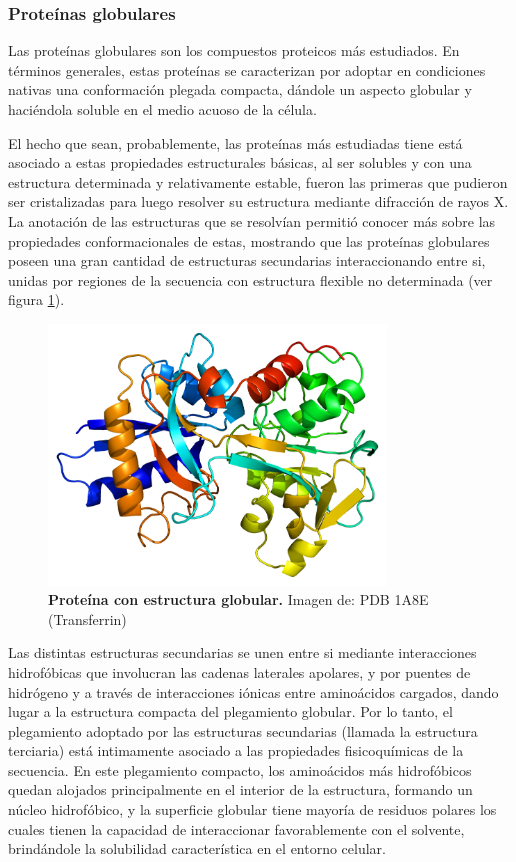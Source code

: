 \subsubsection{Proteínas globulares}

Las proteínas globulares son los compuestos proteicos más estudiados. En términos generales, estas proteínas se caracterizan por adoptar en condiciones nativas una conformación plegada compacta, 
dándole un aspecto globular y haciéndola soluble en el medio acuoso de la célula.




El hecho que sean, probablemente, las proteínas más estudiadas tiene está asociado a estas propiedades estructurales básicas,
al ser solubles y con una estructura determinada y relativamente estable, fueron las primeras que pudieron ser cristalizadas para luego resolver su estructura mediante difracción de rayos X.
La anotación de las estructuras que se resolvían permitió conocer más sobre las propiedades conformacionales de estas, mostrando que las proteínas globulares poseen una gran cantidad de estructuras secundarias interaccionando entre si, 
unidas por regiones de la secuencia con estructura flexible no determinada (ver figura \ref{globularExample}).

\begin{figure}[h]
\centering
\includegraphics[width=0.8\textwidth]{img/transferrin.png} 
\caption{\textbf{Proteína con estructura globular.} Imagen de: PDB 1A8E (Transferrin)} 
\label{globularExample}
\end{figure}

Las distintas estructuras secundarias se unen entre si mediante interacciones hidrofóbicas que involucran las cadenas laterales apolares, y por puentes de hidrógeno y a través de interacciones iónicas entre aminoácidos cargados, dando lugar
a la estructura compacta del plegamiento globular. Por lo tanto, el plegamiento adoptado por las estructuras secundarias (llamada la estructura terciaria) está intimamente asociado a las propiedades fisicoquímicas de la secuencia. 
En este plegamiento compacto, los aminoácidos más hidrofóbicos quedan alojados principalmente en el interior de la estructura, formando un núcleo hidrofóbico, 
y la superficie globular tiene mayoría de residuos polares los cuales tienen la capacidad de interaccionar favorablemente con el solvente, brindándole la solubilidad característica en el entorno celular. 


